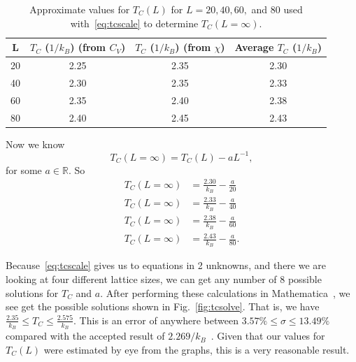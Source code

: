\documentclass[12pt]{article}
\numberwithin{equation}{section}
\begin{document}
\begin{table}[ht]
\begin{center}
\begin{tabular}{c|c|c|c} \hline
L & $T_{C}$ ($1/k_{B}$) (from $C_{V}$) & $T_{C}$ ($1/k_{B}$) (from $\chi$) & Average $T_{C}$ ($1/k_{B}$)\\ \hline
20 & 2.25 & 2.35 & 2.30 \\
40 & 2.30 & 2.35 & 2.33 \\
60 & 2.35 & 2.40 & 2.38 \\
80 & 2.40 & 2.45 & 2.43\\ \hline
\end{tabular}
\caption{Approximate values for $T_{C}(L)$ for $L=20, 40, 60,$ and 80 used with~\eqref{eq:tcscale} to determine $T_{C}(L=\infty)$.}
\label{tab:tcl}
\end{center}
\end{table}

\par  Now we know 
$$
T_{C}(L=\infty)=T_{C}(L)-aL^{-1},
$$
for some $a\in\mathbb{R}$.  So
\begin{align*}
T_{C}(L=\infty) & = \frac{2.30}{k_{B}}-\frac{a}{20} \\
T_{C}(L=\infty) & = \frac{2.33}{k_{B}}-\frac{a}{40} \\
T_{C}(L=\infty) & = \frac{2.38}{k_{B}}-\frac{a}{60} \\
T_{C}(L=\infty) & = \frac{2.43}{k_{B}}-\frac{a}{80}.
\end{align*}
\par Because~\eqref{eq:tcscale} gives us to equations in 2 unknowns, and there we are looking at four different lattice sizes, we can get any number of 8 possible solutions for $T_{C}$ and $a$.  After performing these calculations in Mathematica~\cite{mathematica}, we see get the possible solutions shown in Fig.~\ref{fig:tcsolve}.  That is, we have $\frac{2.35}{k_{B}}\leq T_{C}\leq\frac{2.575}{k_{B}}$.  This is an error of anywhere between $3.57\%\leq\sigma\leq13.49\%$ compared with the accepted result of $2.269/k_{B}$~\cite{lecture}.  Given that our values for $T_{C}(L)$ were estimated by eye from the graphs, this is a very reasonable result.
\end{document}
